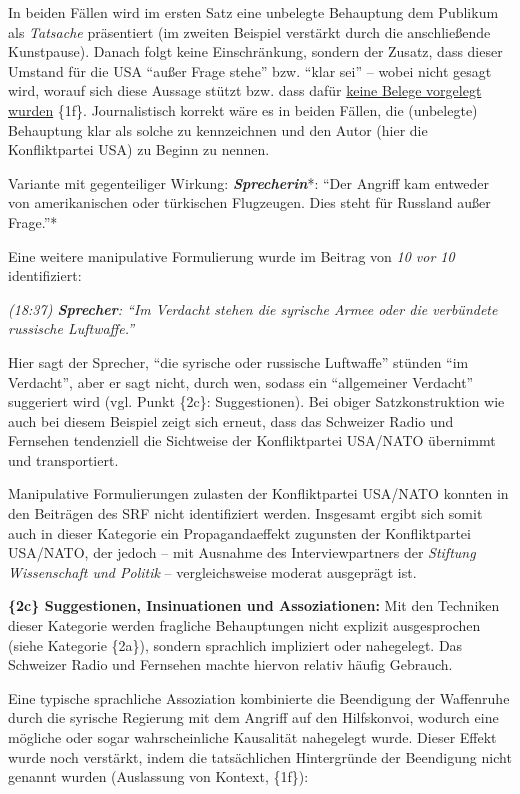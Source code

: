 In beiden Fällen wird im ersten Satz eine unbelegte Behauptung dem
Publikum als \emph{Tatsache} präsentiert (im zweiten Beispiel verstärkt
durch die anschließende Kunstpause). Danach folgt keine Einschränkung,
sondern der Zusatz, dass dieser Umstand für die USA ``außer Frage
stehe'' bzw. ``klar sei'' -- wobei nicht gesagt wird, worauf sich diese
Aussage stützt bzw. dass dafür
\href{http://www.nytimes.com/2016/09/21/world/middleeast/syria-cease-fire.html}{keine
Belege vorgelegt wurden} \{1f\}. Journalistisch korrekt wäre es in
beiden Fällen, die (unbelegte) Behauptung klar als solche zu
kennzeichnen und den Autor (hier die Konfliktpartei USA) zu Beginn zu
nennen.

Variante mit gegenteiliger Wirkung: \emph{\textbf{Sprecherin}}*: ``Der
Angriff kam entweder von amerikanischen oder türkischen Flugzeugen. Dies
steht für Russland außer Frage.''*

Eine weitere manipulative Formulierung wurde im Beitrag von \emph{10 vor
10} identifiziert:

\emph{(18:37) \textbf{Sprecher}: ``Im Verdacht stehen die syrische Armee
oder die verbündete russische Luftwaffe.''}

Hier sagt der Sprecher, ``die syrische oder russische Luftwaffe''
stünden ``im Verdacht'', aber er sagt nicht, durch wen, sodass ein
``allgemeiner Verdacht'' suggeriert wird (vgl. Punkt \{2c\}:
Suggestionen). Bei obiger Satzkonstruktion wie auch bei diesem Beispiel
zeigt sich erneut, dass das Schweizer Radio und Fernsehen tendenziell
die Sichtweise der Konfliktpartei USA/NATO übernimmt und transportiert.

Manipulative Formulierungen zulasten der Konfliktpartei USA/NATO konnten
in den Beiträgen des SRF nicht identifiziert werden. Insgesamt ergibt
sich somit auch in dieser Kategorie ein Propagandaeffekt zugunsten der
Konfliktpartei USA/NATO, der jedoch -- mit Ausnahme des
Interview­partners der \emph{Stiftung Wissenschaft und Politik} --
vergleichsweise moderat ausgeprägt ist.

\textbf{\{2c\} Suggestionen, Insinuationen und Assoziationen:} Mit den
Techniken dieser Kategorie werden fragliche Behauptungen nicht explizit
ausgesprochen (siehe Kategorie \{2a\}), sondern sprachlich impliziert
oder nahegelegt. Das Schweizer Radio und Fernsehen machte hiervon
relativ häufig Gebrauch.

Eine typische sprachliche Assoziation kombinierte die Beendigung der
Waffenruhe durch die syrische Regierung mit dem Angriff auf den
Hilfskonvoi, wodurch eine mögliche oder sogar wahrscheinliche Kausalität
nahegelegt wurde. Dieser Effekt wurde noch verstärkt, indem die
tatsächlichen Hintergründe der Beendigung nicht genannt wurden
(Auslassung von Kontext, \{1f\}):


